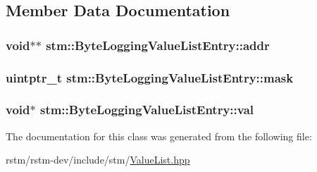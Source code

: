 \subsection{Member Data Documentation}
\hypertarget{classstm_1_1ByteLoggingValueListEntry_af8f2497fb19517a21dab23a99a89a562}{
\subsubsection[{addr}]{\setlength{\rightskip}{0pt plus 5cm}void$\ast$$\ast$ stm\-::\-Byte\-Logging\-Value\-List\-Entry\-::addr\hspace{0.3cm}{\ttfamily [private]}}}\label{classstm_1_1ByteLoggingValueListEntry_af8f2497fb19517a21dab23a99a89a562}
\hypertarget{classstm_1_1ByteLoggingValueListEntry_ad3a8699b42840bd57e487072c92c8012}{
\subsubsection[{mask}]{\setlength{\rightskip}{0pt plus 5cm}uintptr\-\_\-t stm\-::\-Byte\-Logging\-Value\-List\-Entry\-::mask\hspace{0.3cm}{\ttfamily [private]}}}\label{classstm_1_1ByteLoggingValueListEntry_ad3a8699b42840bd57e487072c92c8012}
\hypertarget{classstm_1_1ByteLoggingValueListEntry_a27e92d283a385a490452265a73f03d44}{
\subsubsection[{val}]{\setlength{\rightskip}{0pt plus 5cm}void$\ast$ stm\-::\-Byte\-Logging\-Value\-List\-Entry\-::val\hspace{0.3cm}{\ttfamily [private]}}}\label{classstm_1_1ByteLoggingValueListEntry_a27e92d283a385a490452265a73f03d44}


The documentation for this class was generated from the following file\-:\begin{DoxyCompactItemize}
\item 
rstm/rstm-\/dev/include/stm/\hyperlink{ValueList_8hpp}{Value\-List.\-hpp}\end{DoxyCompactItemize}
